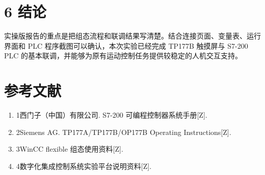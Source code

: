 \documentclass[12pt,a4paper]{ctexart}
\begin{document}
\section*{6 结论}
实操版报告的重点是把组态流程和联调结果写清楚。结合连接页面、变量表、运行界面和 PLC 程序截图可以确认，本次实验已经完成 TP177B 触摸屏与 S7-200 PLC 的基本联调，并能够为原有运动控制任务提供较稳定的人机交互支持。
\section*{参考文献}
\begin{enumerate}
\item 1西门子（中国）有限公司. S7-200 可编程控制器系统手册[Z].
\item 2Siemens AG. TP177A/TP177B/OP177B Operating Instructions[Z].
\item 3WinCC flexible 组态使用资料[Z].
\item 4数字化集成控制系统实验平台说明资料[Z].
\end{enumerate}
\end{document}
